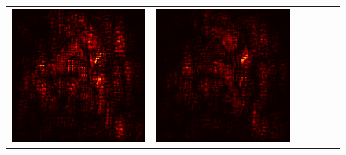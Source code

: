 \documentclass[preprint,12pt]{elsarticle}
\begin{document}
\begin{figure}[p]
\begin{tabular}{cccccc}
  \includegraphics[scale=\scale]{../visualizations/examples/imagenette/cnn/positive_saliency_map/3.png} & 
  \includegraphics[scale=\scale]{../visualizations/examples/imagenette/cnn/negative_saliency_map/3.png} & 

\end{tabular}
\end{figure}
\end{document}
